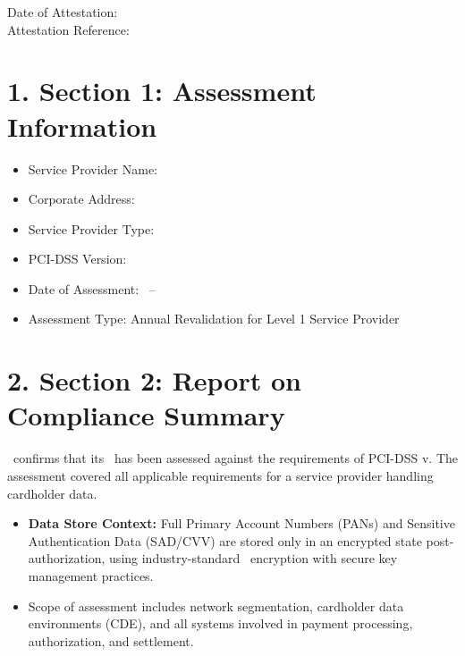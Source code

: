 \documentclass[11pt]{article}
\begin{document}

\begin{center}
Date of Attestation: \PCIAttestationDate \\
Attestation Reference: \PCIAttestationRef
\end{center}

\section*{1. Section 1: Assessment Information}
\begin{itemize}[leftmargin=2em]
  \item[1.1] Service Provider Name: \VendorName
  \item[1.2] Corporate Address: \VendorAddress
  \item[1.3] Service Provider Type: \PCIServiceType
  \item[1.4] PCI-DSS Version: \PCIVersion
  \item[1.5] Date of Assessment: \PCIAssessmentStart\ -- \PCIAssessmentEnd
  \item[1.6] Assessment Type: Annual Revalidation for Level 1 Service Provider
\end{itemize}

\section*{2. Section 2: Report on Compliance Summary}
\VendorName\ confirms that its \SystemName\ has been assessed against the requirements of
PCI-DSS v\PCIVersion. The assessment covered all applicable requirements for a service
provider handling cardholder data.

\begin{itemize}[leftmargin=2em]
  \item \textbf{Data Store Context:} Full Primary Account Numbers (PANs) and Sensitive
  Authentication Data (SAD/CVV) are stored only in an encrypted state post-authorization,
  using industry-standard \PCIEncryptionStandard\ encryption with secure key management
  practices.
  \item Scope of assessment includes network segmentation, cardholder data environments
  (CDE), and all systems involved in payment processing, authorization, and settlement.
\end{itemize}
\end{document}

